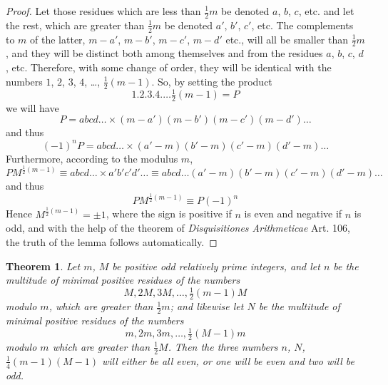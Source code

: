 \documentclass{book}
\theoremstyle{plain}
\newtheorem*{theorem}{Theorem}
\theoremstyle{remark}
\begin{document}
\begin{proof} Let those residues which are less than $\tfrac{1}{2} m$ be denoted $a$, $b$, $c$, etc. and let the rest, which are greater than $\tfrac{1}{2}m$ be denoted $a'$, $b'$, $c'$, etc.  The complements  to $m$ of the latter, $m-a'$, $m-b'$, $m-c'$, $m-d'$ etc., will all be smaller than $\frac{1}{2} m$, and they will be distinct both among themselves and from the residues $a$, $b$, $c$, $d$, etc. Therefore, with some change of order, they will be identical with the numbers $1$, $2$, $3$, $4$, \dots, $\tfrac{1}{2}(m-1)$.  So, by setting the product
\[ 1.2.3.4.\dots\tfrac{1}{2}(m-1) = P \]
we will have 
\[ P = abcd\dots \times (m-a')(m-b')(m-c')(m-d') \dots \]
and thus
\[ (-1)^nP = abcd\dots\times(a'-m)(b'-m)(c'-m)(d'-m) \dots \]
Furthermore, according to the modulus $m$, 
\[ PM^{\tfrac{1}{2}(m-1)} \equiv abcd\dots\times a'b'c'd'\dots\equiv abcd\dots(a'-m)(b'-m)(c'-m)(d'-m)\dots \]
and thus
\[ PM^{\frac{1}{2}(m-1)} \equiv P(-1)^n \]
Hence $M^{\frac{1}{2}(m-1)} = \pm 1$, where the sign is positive if $n$ is even and negative if $n$ is odd, and with the help of the theorem of \textit{Disquisitiones Arithmeticae} Art. 106, the truth of the lemma follows automatically.
\end{proof}
\begin{theorem} Let $m$, $M$ be positive odd relatively prime integers, and let $n$ be the multitude of  minimal positive residues of the numbers
\[ M, 2M, 3M, \dots, \tfrac{1}{2}(m-1)M \]
modulo $m$, which are greater than $\tfrac{1}{2}m$; and likewise let $N$ be the multitude of minimal positive residues of the numbers 
\[ m, 2m, 3m, \dots, \tfrac{1}{2}(M-1)m \]
modulo $m$ which are greater than $\tfrac{1}{2}M$.  Then the three numbers $n$, $N$, $\tfrac{1}{4}(m-1)(M-1)$ will either be all even, or one will be even and two will be odd. \end{theorem}
\end{document}

